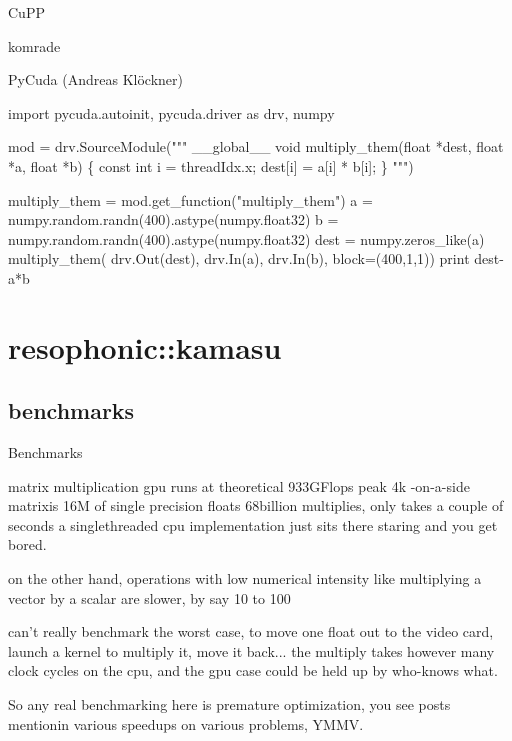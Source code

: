 \begin{frame}{CuPP}
  
\end{frame}

\begin{frame}{komrade}
  
\end{frame}


\begin{frame}[fragile]{PyCuda (Andreas Kl\"ockner)}
  \begin{semiverbatim}import pycuda.autoinit, pycuda.driver as drv, numpy

mod = drv.SourceModule("""
__global__ void multiply_them(float *dest, float *a, float *b)
\{
  const int i = threadIdx.x;
  dest[i] = a[i] * b[i];
\}
""")

multiply_them = mod.get_function("multiply_them")
a = numpy.random.randn(400).astype(numpy.float32)
b = numpy.random.randn(400).astype(numpy.float32)
dest = numpy.zeros_like(a)
multiply_them(
    drv.Out(dest), drv.In(a), drv.In(b),
    block=(400,1,1))
print dest-a*b
  \end{semiverbatim}



\end{frame}

\section{resophonic::kamasu}
\subsection{benchmarks}

\begin{frame}{Benchmarks}
\end{frame}


\begin{frame}{matrix multiplication}
gpu runs at theoretical 933GFlops peak 4k -on-a-side matrixis 16M of
single precision floats 68billion multiplies, only takes a couple of
seconds a singlethreaded cpu implementation just sits there staring
and you get bored.

on the other hand, operations with low numerical intensity like
multiplying a vector by a scalar are slower, by say 10 to 100

can't really benchmark the worst case, to move one float out to the
video card, launch a kernel to multiply it, move it back... the
multiply takes however many clock cycles on the cpu, and the gpu case
could be held up by who-knows what.   

So any real benchmarking here is premature optimization, you see posts
mentionin various speedups on various problems, YMMV.  
\end{frame}

